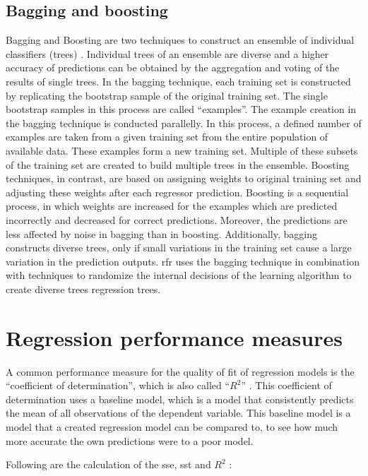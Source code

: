 \documentclass[a4paper, 11pt, oneside]{Thesis}  %
\begin{document}
\subsection{Bagging and boosting}

Bagging and Boosting are two techniques to construct an ensemble of individual classifiers (trees) \cite{Dietterich.2000}. Individual trees of an ensemble are diverse and a higher accuracy of predictions can be obtained by the aggregation and voting of the results of single trees. In the bagging technique, each training set is constructed by replicating the bootstrap sample of the original training set. The single bootstrap samples in this process are called “examples”. The example creation in the bagging technique is conducted parallelly. In this process, a defined number of examples are taken from a given training set from the entire population of available data. These examples form a new training set. Multiple of these subsets of the training set are created to build multiple trees in the ensemble. Boosting techniques, in contrast, are based on assigning weights to original training set and adjusting these weights after each regressor prediction. Boosting is a sequential process, in which weights are increased for the examples which are predicted incorrectly and decreased for correct predictions. Moreover, the predictions are less affected by noise in bagging than in boosting. Additionally, bagging constructs diverse trees, only if small variations in the training set cause a large variation in the prediction outputs. \ac{rfr} uses the bagging technique in combination with techniques to randomize the internal decisions of the learning algorithm to create diverse trees regression trees.


\section{Regression performance measures}

A common performance measure for the quality of fit of regression models is the ``coefficient of determination'', which is also called ``$R^2$'' \cite{Devasthali.2018}. This coefficient of determination uses a baseline model, which is a model that consistently predicts the mean of all observations of the dependent variable. This baseline model is a model that a created regression model can be compared to, to see how much more accurate the own predictions were to a poor model.

Following are the calculation of the \ac{sse}, \ac{sst} and $R^2$ \cite{Devasthali.2018}:
\end{document}
